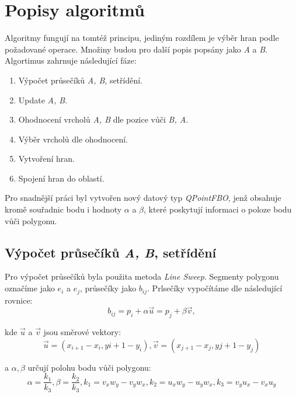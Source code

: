 \documentclass[11pt]{article}
\begin{document}

\section{Popisy algoritmů}
Algoritmy fungují na tomtéž principu, jediným rozdílem je výběr hran podle požadované operace. Množiny budou pro další popis popsány jako \textit{A} a \textit{B}. 
Algortimus zahrnuje následující fáze:
\begin{enumerate}
	\item Výpočet průsečíků \textit{A, B}, setřídění.
	\item Update\textit{ A, B}.
	\item Ohodnocení vrcholů \textit{A, B} dle pozice vůči \textit{B, A}.
	\item Výběr vrcholů dle ohodnocení. 
	\item Vytvoření hran.
	\item Spojení hran do oblastí.
\end{enumerate}

Pro snadnější práci byl vytvořen nový datový typ \textit{QPointFBO}, jenž obsahuje kromě souřadnic bodu i hodnoty $ \alpha $ a $ \beta $, které poskytují informaci o poloze bodu vůči polygonu.

\subsection{Výpočet průsečíků \textit{A, B}, setřídění}
Pro výpočet průsečíků byla použita metoda \textit{Line Sweep}. 
Segmenty polygonu označíme jako $ e_i $ a $ e_j $, průsečíky jako $ b_{ij} $.
Prlsečíky vypočítáme dle následující rovnice:
\begin{equation}\label{průsečíky}
	b_{ij} = p_i + \alpha \overrightarrow{u} = p_j + \beta \overrightarrow{v},
\end{equation}

kde $ \overrightarrow{u} $ a $ \overrightarrow{v} $ jsou směrové vektory:
\begin{equation}\label{smerove vektory}
	\overrightarrow{u} = (x_{i+1} - x_i, y{i+1} - y_i), \overrightarrow{v} = (x_{j+1} - x_j, y{j+1} - y_j)
\end{equation}

a $ \alpha, \beta $ určují polohu bodu vůči polygonu:
\begin{equation}\label{alfa, beta}
	\alpha = \frac{k_1}{k_3}, 	\beta = \frac{k_2}{k_3}, k_1 = v_x w_y - v_y w_x, k_2 = u_x w_y - u_y w_x, k_3 = v_y u_x - v_x u_y
\end{equation}
\end{document}
